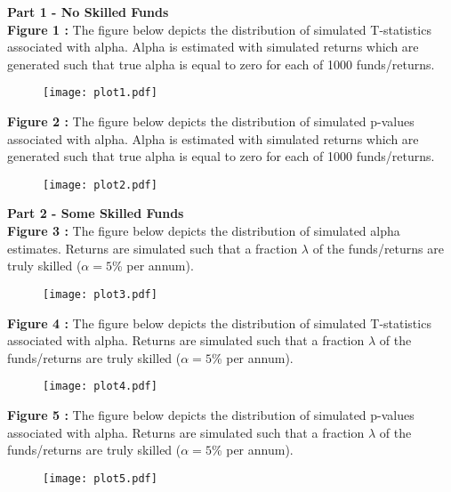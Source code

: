 \documentclass{article}
\begin{document}
\textbf{Part 1 - No Skilled Funds} \\\textbf{Figure 1 : }The figure below depicts the distribution of simulated T-statistics associated with alpha. Alpha is estimated with simulated returns which are generated such that true alpha is equal to zero for each of 1000 funds/returns.
\begin{center}
 \begin{figure}[h!]
 \texttt{[image: plot1.pdf]}\label{fig:plot1}
 \end{figure}
 \end{center}
\clearpage 
\textbf{Figure 2 : }The figure below depicts the distribution of simulated p-values associated with alpha. Alpha is estimated with simulated returns which are generated such that true alpha is equal to zero for each of 1000 funds/returns.
\begin{center}
 \begin{figure}[h!]
 \texttt{[image: plot2.pdf]}\label{fig:plot2}
 \end{figure}
 \end{center}
\clearpage 
\textbf{Part 2 - Some Skilled Funds} \\\textbf{Figure 3 : }The figure below depicts the distribution of simulated alpha estimates. Returns are simulated such that a fraction $\lambda$ of the funds/returns are truly skilled ($\alpha =5$\% per annum).
\begin{center}
 \begin{figure}[h!]
 \texttt{[image: plot3.pdf]}\label{fig:plot3}
 \end{figure}
 \end{center}
\clearpage 
\textbf{Figure 4 : }The figure below depicts the distribution of simulated T-statistics associated with alpha. Returns are simulated such that a fraction $\lambda$ of the funds/returns are truly skilled ($\alpha =5$\% per annum).
\begin{center}
 \begin{figure}[h!]
 \texttt{[image: plot4.pdf]}\label{fig:plot4}
 \end{figure}
 \end{center}
\clearpage 
\textbf{Figure 5 : }The figure below depicts the distribution of simulated p-values associated with alpha. Returns are simulated such that a fraction $\lambda$ of the funds/returns are truly skilled ($\alpha =5$\% per annum).
\begin{center}
 \begin{figure}[h!]
 \texttt{[image: plot5.pdf]}\label{fig:plot5}
 \end{figure}
 \end{center}
\end{document}
